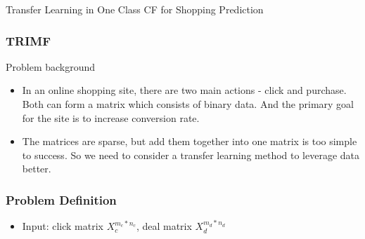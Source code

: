 \documentclass[xetex,mathserif,serif]{beamer}
\begin{document}
\begin{section}{Transfer Learning in One Class CF for Shopping Prediction}
  \begin{frame}
    \frametitle{TRIMF}
    \begin{block}{Problem background}
      \begin{itemize}
      \item
        \par{In an online shopping site, there are two main actions - click and purchase. Both can form a matrix which consists of binary data. And the primary goal for the site is to increase \alert{conversion rate}.}
      \item
        \par{The matrices are sparse, but add them together into one matrix is too simple to success. So we need to consider a transfer learning method to leverage data better.}
      \end{itemize}
    \end{block}
  \end{frame}
  \begin{frame}
    \frametitle{Problem Definition}
    \begin{itemize}
    \item Input: click matrix $X_c^{m_c*n_c}$, deal matrix $X_d^{m_d*n_d}$


\end{itemize}
\end{frame}
\end{section}
\end{document}
